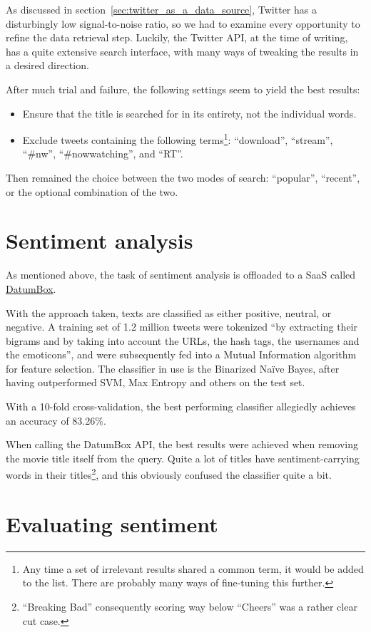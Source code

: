 As discussed in section~\ref{sec:twitter_as_a_data_source}, Twitter has a disturbingly low signal-to-noise ratio, so we had to examine every opportunity to refine the data retrieval step.
Luckily, the Twitter API, at the time of writing, has a quite extensive search interface, with many ways of tweaking the results in a desired direction.

After much trial and failure, the following settings seem to yield the best results:

\begin{itemize}
  \item Ensure that the title is searched for in its entirety, not the individual words.
  \item Exclude tweets containing the following terms\footnote{Any time a set of irrelevant results shared a common term, it would be added to the list. There are probably many ways of fine-tuning this further.}: ``download'', ``stream'', ``#nw'', ``#nowwatching'', and ``RT''.
\end{itemize}

Then remained the choice between the two modes of search: ``popular'', ``recent'', or the optional combination of the two.



\section{Sentiment analysis} %
\label{sec:sentiment_analysis}

As mentioned above, the task of sentiment analysis is offloaded to a SaaS called \url{DatumBox}.

With the approach taken, texts are classified as either positive, neutral, or negative.
A training set of 1.2 million tweets were tokenized ``by extracting their bigrams and by taking into account the URLs, the hash tags, the usernames and the emoticons'', and were subsequently fed into a Mutual Information algorithm for feature selection.
The classifier in use is the Binarized Naïve Bayes, after having outperformed SVM, Max Entropy and others on the test set.

With a 10-fold cross-validation, the best performing classifier allegiedly achieves an accuracy of 83.26\%.

When calling the DatumBox API, the best results were achieved when removing the movie title itself from the query.
Quite a lot of titles have sentiment-carrying words in their titles\footnote{``Breaking Bad'' consequently scoring way below ``Cheers'' was a rather clear cut case.}, and this obviously confused the classifier quite a bit.


\section{Evaluating sentiment} %
\label{sec:evaluating_sentiment}



